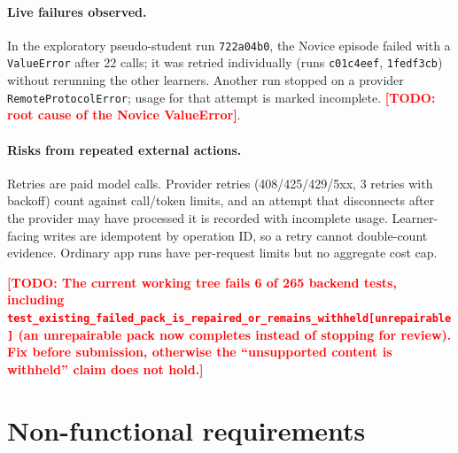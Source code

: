 \documentclass{article}
\newcommand{\todo}[1]{\textcolor{red}{\textbf{[TODO: #1]}}}
\newcommand{\code}[1]{\texttt{\small #1}}
\begin{document}
\paragraph{Live failures observed.} In the exploratory pseudo-student run \code{722a04b0}, the Novice episode failed with a \code{ValueError} after 22 calls; it was retried individually (runs \code{c01c4eef}, \code{1fedf3cb}) without rerunning the other learners. Another run stopped on a provider \code{RemoteProtocolError}; usage for that attempt is marked incomplete. \todo{root cause of the Novice ValueError}.

\paragraph{Risks from repeated external actions.} Retries are paid model calls. Provider retries (408/425/429/5xx, 3 retries with backoff) count against call/token limits, and an attempt that disconnects after the provider may have processed it is recorded with incomplete usage. Learner-facing writes are idempotent by operation ID, so a retry cannot double-count evidence. Ordinary app runs have per-request limits but no aggregate cost cap.

\todo{The current working tree fails 6 of 265 backend tests, including \code{test\_existing\_failed\_pack\_is\_repaired\_or\_remains\_withheld[unrepairable]} (an unrepairable pack now completes instead of stopping for review). Fix before submission, otherwise the ``unsupported content is withheld'' claim does not hold.}

\section{Non-functional requirements}
\label{sec:nfr}
\end{document}
